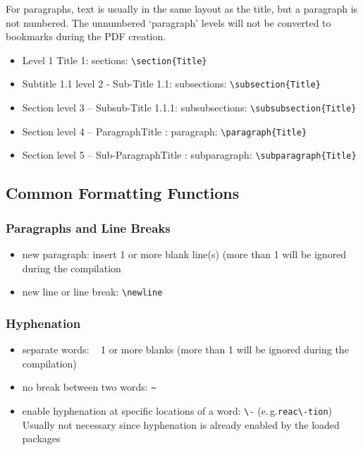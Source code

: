 \documentclass{pharmrep}
\newcommand{\eg}{e.\,g.\xspace}
\begin{document}
For paragraphs, text is usually in the same layout as the title, but a paragraph is not numbered. The
unnumbered `paragraph' levels will not be converted to bookmarks during the PDF creation.
\begin{itemize}
   \item Level 1 Title 1: sections: \verb|\section{Title}|
   \item Subtitle 1.1 level 2 - Sub-Title 1.1: subsections: \verb|\subsection{Title}|
   \item Section level 3 -- Subsub-Title 1.1.1: subsubsections: \verb|\subsubsection{Title}|
   \item Section level 4 -- ParagraphTitle : paragraph: \verb|\paragraph{Title}|
   \item Section level 5 -- Sub-ParagraphTitle : subparagraph: \verb|\subparagraph{Title}|
\end{itemize}

\subsection{Common Formatting Functions}
\subsubsection{Paragraphs and Line Breaks}
\begin{itemize}
\item new paragraph: insert 1 or more blank line(s)  (more than 1 will be ignored during the
compilation
\item new line or line break: \verb|\newline|
\end{itemize}

\subsubsection{Hyphenation}
\begin{itemize}
\item separate words: \verb| | 1 or more blanks (more than 1 will be ignored during the compilation)
\item no break between two words: \verb|~|
\item enable hyphenation at specific locations of a word: \verb|\-| (\eg \verb|reac\-tion|) Usually not necessary since hyphenation is already enabled by the loaded packages
\end{itemize}
\end{document}
